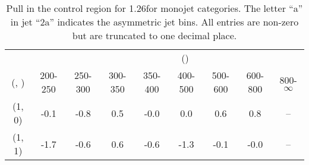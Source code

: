 \begin{table}[h!]
\tiny
\centering
\caption{Pull in the \mmj control region for 1.26\ifb for monojet categories. The letter ``a'' in jet \eg ``2a''  indicates the asymmetric jet bins. All entries are non-zero but are truncated to one decimal place.\label{tab:pullsep_mumu_ewk_mono}}
\begin{tabular}
{ccccccccc}
	\hline\hline
&	& \multicolumn{8}{c}{\scalht (\gev)} \\ 
	 (\njet,  \nb) & 200-250 & 250-300 & 300-350 & 350-400 & 400-500 & 500-600 & 600-800 & 800-$\infty$ \\ [0.8ex] 
\hline
	(1, 0) & -0.1 & -0.8 & 0.5 & -0.0 & 0.0 & 0.6 & 0.8 & -- \\[0.5ex] 
	(1, 1) & -1.7 & -0.6 & 0.6 & -0.6 & -1.3 & -0.1 & -0.0 & -- \\[0.5ex] 
	\hline
	\hline
\end{tabular}
\end{table}

